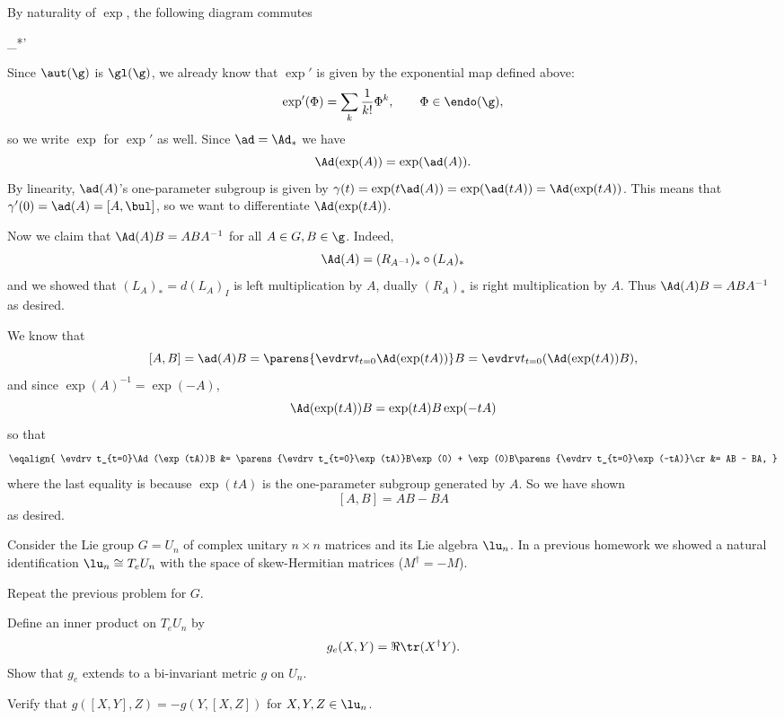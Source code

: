         \item By naturality of $\exp$, the following diagram commutes

            {\Ad_*}{\Ad}{\exp}{\exp'}

        Since $\aut(\g)$ is $\gl(\g)$, we already know that $\exp'$ is given by the exponential map defined above:
        $$ \exp'(\Phi) = \sum_k\frac1{k!}\Phi^k,\qquad \Phi\in\endo(\g) , $$
        so we write $\exp$ for $\exp'$ as well.
        Since $\ad=\Ad_*$ we have
        $$ \Ad(\exp(A)) = \exp(\ad(A)) . $$
        By linearity, $\ad(A)$'s one-parameter subgroup is given by $\gamma(t)=\exp(t\ad(A))=\exp(\ad(tA))=\Ad(\exp(tA))$.
        This means that $\gamma'(0)=\ad(A)=[A,\bul]$, so we want to differentiate $\Ad(\exp(tA))$.

        Now we claim that $\Ad(A)B=ABA^{-1}$ for all $A\in G,B\in\g$.
        Indeed,
        $$ \Ad(A) = (R_{A^{-1}})_*\circ(L_A)_* $$
        and we showed that $(L_A)_*=d(L_A)_I$ is left multiplication by $A$, dually $(R_A)_*$ is right multiplication by $A$.
        Thus $\Ad(A)B=ABA^{-1}$ as desired.

        We know that
        $$ [A,B] = \ad(A)B = \parens{\evdrv t_{t=0}\Ad(\exp(tA))}B = \evdrv t_{t=0}(\Ad(\exp(tA))B) , $$
        and since $\exp(A)^{-1}=\exp(-A)$,
        $$ \Ad(\exp(tA))B = \exp(tA)B\exp(-tA) $$
        so that 
        $$ \eqalign{
            \evdrv t_{t=0}\Ad(\exp(tA))B &= \parens{\evdrv t_{t=0}\exp(tA)}B\exp(0) + \exp(0)B\parens{\evdrv t_{t=0}\exp(-tA)}\cr
            &= AB - BA,
        } $$
        where the last equality is because $\exp(tA)$ is the one-parameter subgroup generated by $A$.
        So we have shown
        $$ [A,B] = AB - BA $$
        as desired.
    \eenum
\eenum

\bprob

    Consider the Lie group $G=U_n$ of complex unitary $n\times n$ matrices and its Lie algebra $\lu_n$.
    In a previous homework we showed a natural identification $\lu_n\cong T_eU_n$ with the space of skew-Hermitian matrices ($M^\dagger=-M$).
    \benum
        \item Repeat the previous problem for $G$.
        \item Define an inner product on $T_eU_n$ by
        $$ g_e(X,Y) = \Re\tr(X^\dagger Y) . $$
        Show that $g_e$ extends to a bi-invariant metric $g$ on $U_n$.
        \item Verify that $g([X,Y],Z)=-g(Y,[X,Z])$ for $X,Y,Z\in\lu_n$.
    \eenum

